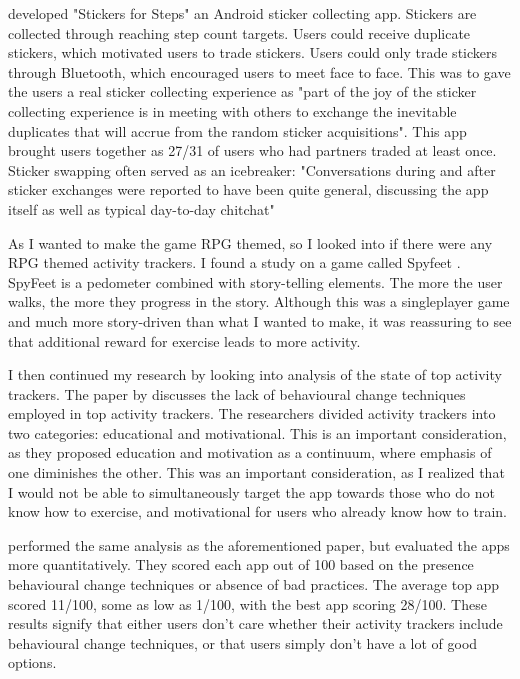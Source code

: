 \documentclass{l4proj}
\begin{document}
\citet{Stickers} developed "Stickers for Steps" an Android sticker collecting app. Stickers are collected through reaching step count targets. Users could receive duplicate stickers, which motivated users to trade stickers. Users could only trade stickers through Bluetooth, which encouraged users to meet face to face. This was to gave the users a real sticker collecting experience as "part of the joy of the sticker collecting experience is in meeting with others to exchange the inevitable duplicates that will accrue from the random sticker acquisitions". This app brought users together as 27/31 of users who had partners traded at least once. Sticker swapping often served as an icebreaker: "Conversations during and after sticker exchanges were reported to have been quite general, discussing the app itself as well as typical day-to-day chitchat"

As I wanted to make the game RPG themed, so I looked into if there were any RPG themed activity trackers. I found a study on a game called Spyfeet \citep{SpyFeet}. SpyFeet is a pedometer combined with story-telling elements. The more the user walks, the more they progress in the story. Although this was a singleplayer game and much more story-driven than what I wanted to make, it was reassuring to see that additional reward for exercise leads to more activity.

I then continued my research by looking into analysis of the state of top activity trackers. The paper by \citet{Behavior_change} discusses the lack of behavioural change techniques employed in top activity trackers. The researchers divided activity trackers into two categories: educational and motivational. This is an important consideration, as they proposed education and motivation as a continuum, where emphasis of one diminishes the other. This was an important consideration, as I realized that I would not be able to simultaneously target the app towards those who do not know how to exercise, and motivational for users who already know how to train.

\citet{AppsOfSteel} performed the same analysis as the aforementioned paper, but evaluated the apps more quantitatively. They scored each app out of 100 based on the presence behavioural change techniques or absence of bad practices. The average top app scored 11/100, some as low as 1/100, with the best app scoring 28/100. These results signify that either users don't care whether their activity trackers include behavioural change techniques, or that users simply don't have a lot of good options.
\end{document}

